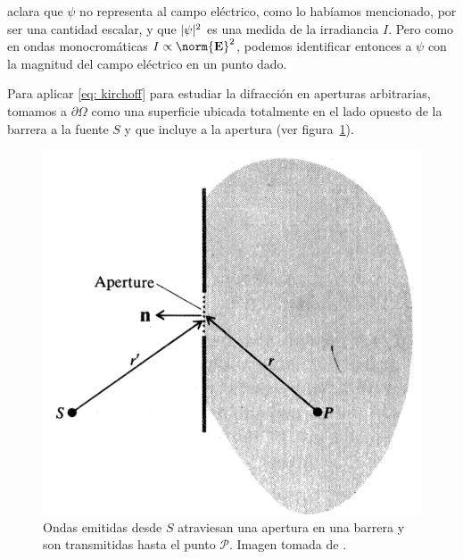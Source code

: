 \begin{multicols}{2}
\parencite{fowles-1989} aclara que $\psi$ no representa al campo eléctrico, como lo habíamos mencionado, por ser una cantidad escalar, y que $\lvert\psi\rvert^2$ es una medida de la irradiancia $I$. Pero como en ondas monocromáticas $I \propto \norm{\vec E}^2$, podemos identificar entonces a $\psi$ con la magnitud del campo eléctrico en un punto dado.

Para aplicar \eqref{eq: kirchoff} para estudiar la difracción en aperturas arbitrarias, tomamos a $\partial \Omega$ como una superficie ubicada totalmente en el lado opuesto  de la barrera a la fuente $S$ y que incluye a la apertura (ver figura~\ref{fig: application}).

\begin{figure}[H]
	\centering
	\includegraphics[width=.7\linewidth]{Imagenes/fresnel}
	\caption{Ondas emitidas desde $S$ atraviesan una apertura en una barrera y son transmitidas hasta el punto $\mathcal P$. Imagen tomada de \parencite{fowles-1989}.}
	\label{fig: application}
\end{figure}


\end{multicols}
